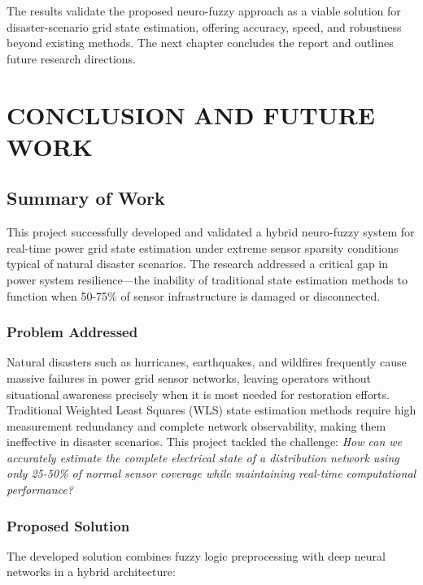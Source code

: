\documentclass[12pt,a4paper]{report}
\begin{document}
The results validate the proposed neuro-fuzzy approach as a viable solution for disaster-scenario grid state estimation, offering accuracy, speed, and robustness beyond existing methods. The next chapter concludes the report and outlines future research directions.


\chapter{CONCLUSION AND FUTURE WORK}

\section{Summary of Work}

This project successfully developed and validated a hybrid neuro-fuzzy system for real-time power grid state estimation under extreme sensor sparsity conditions typical of natural disaster scenarios. The research addressed a critical gap in power system resilience—the inability of traditional state estimation methods to function when 50-75\% of sensor infrastructure is damaged or disconnected.

\subsection{Problem Addressed}

Natural disasters such as hurricanes, earthquakes, and wildfires frequently cause massive failures in power grid sensor networks, leaving operators without situational awareness precisely when it is most needed for restoration efforts. Traditional Weighted Least Squares (WLS) state estimation methods require high measurement redundancy and complete network observability, making them ineffective in disaster scenarios. This project tackled the challenge: \textit{How can we accurately estimate the complete electrical state of a distribution network using only 25-50\% of normal sensor coverage while maintaining real-time computational performance?}

\subsection{Proposed Solution}

The developed solution combines fuzzy logic preprocessing with deep neural networks in a hybrid architecture:
\end{document}
